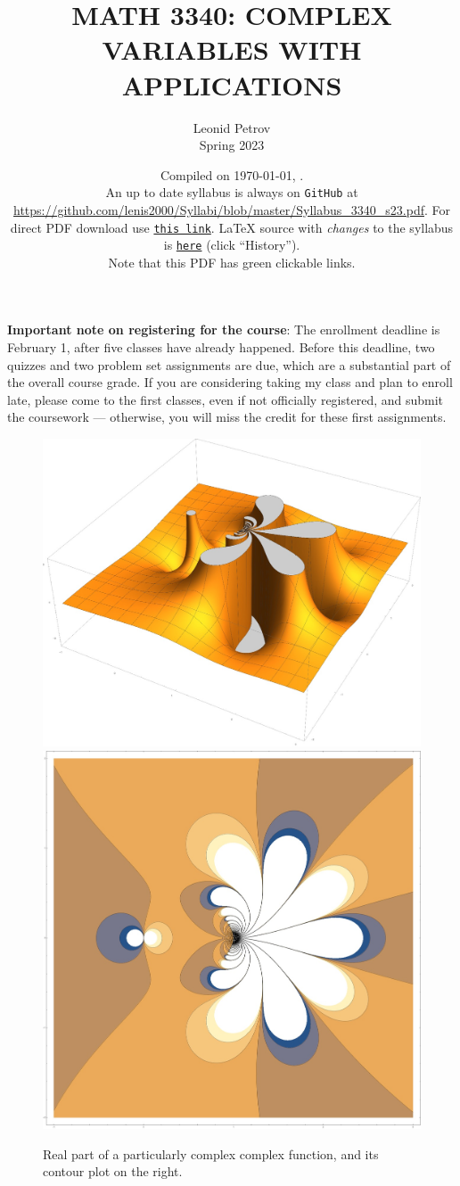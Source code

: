\documentclass[oneside,11pt]{amsart}
\begin{document}
\title[MATH 3340: COMPLEX VARIABLES WITH APPLICATIONS]{MATH 3340: COMPLEX VARIABLES WITH APPLICATIONS}
\author{Leonid Petrov\\Spring 2023}
\date{Compiled on \today, \currenttime{}.\\An up to date syllabus is always on \texttt{GitHub} at \url{https://github.com/lenis2000/Syllabi/blob/master/Syllabus_3340_s23.pdf}. For direct PDF download use \href{https://github.com/lenis2000/Syllabi/raw/master/Syllabus_3340_s23.pdf}{\texttt{this link}}.
	\LaTeX{} source with \textit{changes} to the syllabus is \href{https://github.com/lenis2000/Syllabi/blob/master/Syllabus_3340_s23.tex}{\texttt{here}}
(click ``History'').
\\Note that this PDF has green clickable links.}
\maketitle

\textbf{Important note on registering for the course}: The enrollment deadline is February 1, after five classes have already happened. Before this deadline, two quizzes and two problem set assignments are due, which are a substantial part of the overall course grade. If you are considering taking my class and plan to enroll late, please come to the first classes, even if not officially registered, and submit the coursework --- otherwise, you will miss the credit for these first assignments.

\begin{figure}[h]
	\includegraphics[height=.4\textwidth]{img/complex_f.jpg}
	\qquad 
	\includegraphics[height=.4\textwidth]{img/complex_f2.jpg}
	\caption{Real part of a particularly complex complex function, and 
	its contour plot on the right.}
\end{figure}
\end{document}
